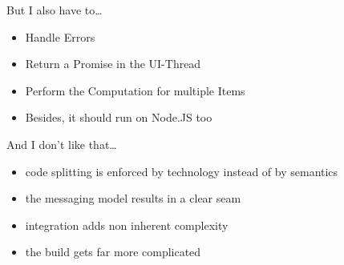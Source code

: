 \begin{frame}{But I also have to\dots}
	\begin{itemize}
		\item Handle Errors 
		\item Return a Promise in the UI-Thread
		\item Perform the Computation for multiple Items
		\item Besides, it should run on Node.JS too
	\end{itemize}
\end{frame}

\begin{frame}{And I don't like that\dots}
	\begin{itemize}
		\item code splitting is enforced by technology instead of by semantics
		\item the messaging model results in a clear seam 
		\item integration adds non inherent complexity
		\item the build gets far more complicated
	\end{itemize}
\end{frame}